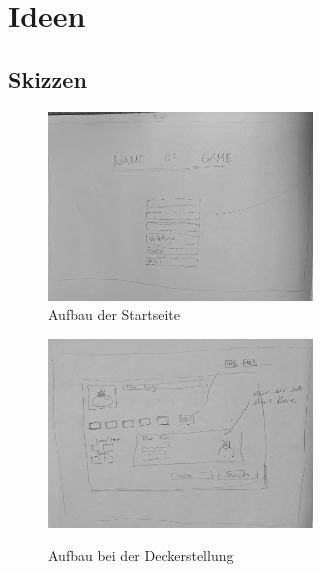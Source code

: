 \chapter{Ideen}

\renewcommand{\figurename}{Abb.}

\section{Skizzen}

    \begin{figure}[H]
        \centering
        \begin{minipage}[H]{7cm}
        \centering
        \includegraphics[width=7cm]{resources/Sk_startpage.jpeg}\\
        \caption{Aufbau der Startseite}
        \end{minipage}\hfill
        \begin{minipage}[H]{7cm}
        \centering
        \includegraphics[width=7cm]{resources/SK_auswahl.jpeg}\\
        \caption{Aufbau bei der Deckerstellung}
        \end{minipage}
    \end{figure}

